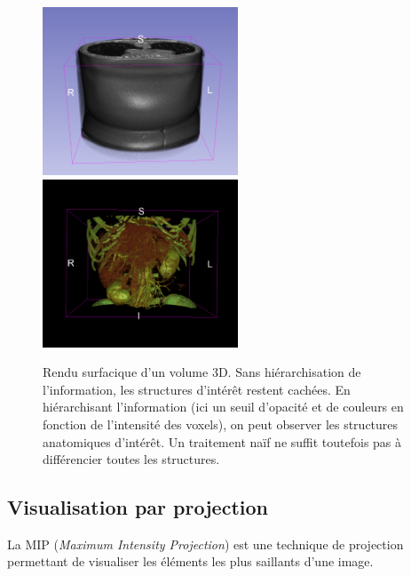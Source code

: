     \begin{figure}[!ht]
      \centering
      \includegraphics[height=5cm]{Images/hierarchy_3D.png}
      \includegraphics[height=5cm]{Images/hierarchy_3D_bis.png}
      \caption{Rendu surfacique d'un volume 3D. Sans hiérarchisation de l'information, les structures d'intérêt restent cachées. En hiérarchisant l'information (ici un seuil d'opacité et de couleurs en fonction de l'intensité des voxels), on peut observer les structures anatomiques d'intérêt. Un traitement naïf ne suffit toutefois pas à différencier toutes les structures.}
      \label{fig:hierachy_3D}
    \end{figure}


      \subsection{Visualisation par projection}

      La MIP (\textit{Maximum Intensity Projection}) est une technique de projection permettant de visualiser les éléments les plus saillants d'une image.  

